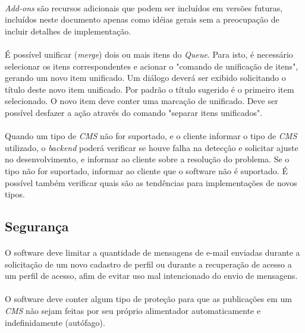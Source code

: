 \documentclass[a4paper,12pt]{article}
\def\cms{\emph{CMS}}
\def\queue{\emph{Queue}}
\begin{document}
\paragraph{}
\emph{Add-ons} são recursos adicionais que podem ser incluídos em versões
futuras, incluídos neste documento apenas como idéias gerais sem a preocupação
de incluir detalhes de implementação.

\paragraph{}
É possível unificar (\emph{merge}) dois ou mais itens do \queue{}. Para isto, é
necessário selecionar os itens correspondentes e acionar o "comando de
unificação de itens", gerando um novo item unificado. Um diálogo deverá ser
exibido solicitando o título deste novo item unificado. Por padrão o título
sugerido é o primeiro item selecionado. O novo item deve conter uma marcação de
unificado. Deve ser possível desfazer a ação através do comando "separar itens
unificados".

\paragraph{}
Quando um tipo de \cms{} não for suportado, e o cliente informar o tipo de
\cms{} utilizado, o \emph{backend} poderá verificar se houve falha na detecção
e solicitar ajuste no desenvolvimento, e informar ao cliente sobre a resolução
do problema. Se o tipo não for suportado, informar ao cliente que o software
não é suportado. É possível também verificar quais são as tendências para
implementações de novos tipos.

\subsection{Segurança}

\paragraph{}
O software deve limitar a quantidade de mensagens de e-mail enviadas durante a
solicitação de um novo cadastro de perfil ou durante a recuperação de acesso a
um perfil de acesso, afim de evitar uso mal intencionado do envio de mensagens.

\paragraph{}
O software deve conter algum tipo de proteção para que as publicações em um
\cms{} não sejam feitas por seu próprio alimentador automaticamente e
indefinidamente (autófago).
\end{document}
